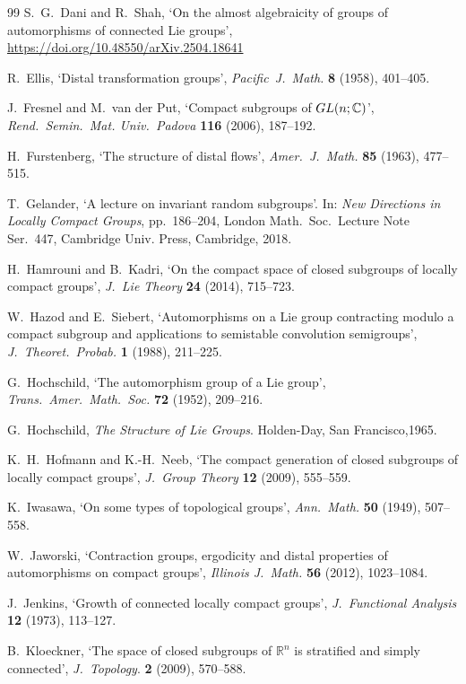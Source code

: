 \documentclass{amsart}
\numberwithin{equation}{section}
\newcommand{\R}{{\mathbb R}}
\newcommand{\C}{{\mathbb C}}
\newcommand{\GL}{{\rm GL}}
\theoremstyle{remark}
\begin{document}
\begin{thebibliography}{99}
 S.\ G.\ Dani and R.\ Shah, `On the almost algebraicity of groups of
automorphisms of connected Lie groups', \textcolor{blue}{\url{https://doi.org/10.48550/arXiv.2504.18641}}

 R.\ Ellis, `Distal transformation groups', {\em Pacific\ J.\ Math.} {\bf 8} (1958), 401--405.

 J.\ Fresnel and M.\ van der Put, `Compact subgroups of $\GL(n;\C)$', {\em Rend.\ 
Semin.\ Mat. Univ.\ Padova} {\bf 116} (2006), 187--192.

 H.\ Furstenberg, `The structure of distal flows', {\em Amer.\ J.\ Math.} {\bf 85} (1963), 477--515.

 T.\ Gelander, `A lecture on invariant random subgroups'. In: {\em New Directions in Locally Compact Groups}, 
pp.\ 186--204, London Math.\ Soc.\ Lecture Note Ser.\ 447, Cambridge Univ. Press, Cambridge, 2018.

 H.\ Hamrouni and B.\ Kadri, `On the compact space of closed subgroups of locally compact
groups', {\em J.\ Lie Theory} {\bf 24} (2014), 715--723.

 W.\ Hazod and E.\ Siebert, `Automorphisms on a Lie group contracting modulo
a compact subgroup and applications to semistable convolution semigroups', {\em J.\ Theoret.\ Probab.} 
{\bf 1} (1988), 211--225.

 G.\ Hochschild, `The automorphism group of a Lie group', {\em Trans.\ Amer.\ Math.\ Soc.} 
{\bf 72} (1952), 209--216.

 G.\ Hochschild, {\em The Structure of Lie Groups}. Holden-Day, San Francisco,1965.

 K.\ H.\ Hofmann and K.-H.\ Neeb, `The compact generation of closed subgroups of locally compact groups', 
{\em J.\ Group Theory} {\bf 12} (2009), 555--559. 

  K.\ Iwasawa, `On some types of topological groups', {\em Ann.\ Math.} {\bf 50} (1949), 507--558.

 W.\ Jaworski, `Contraction groups, ergodicity and distal properties of
automorphisms on compact groups', {\em Illinois J.\ Math.} {\bf 56} (2012), 1023--1084.

 J.\ Jenkins, `Growth of connected locally compact groups',  {\em J.\ Functional Analysis} {\bf 12} (1973), 113--127.

 B.\ Kloeckner, `The space of closed subgroups of $\R^n$ is stratified and simply connected', {\em J.\ Topology}. 
{\bf 2} (2009), 570--588.


\end{thebibliography}
\end{document}
